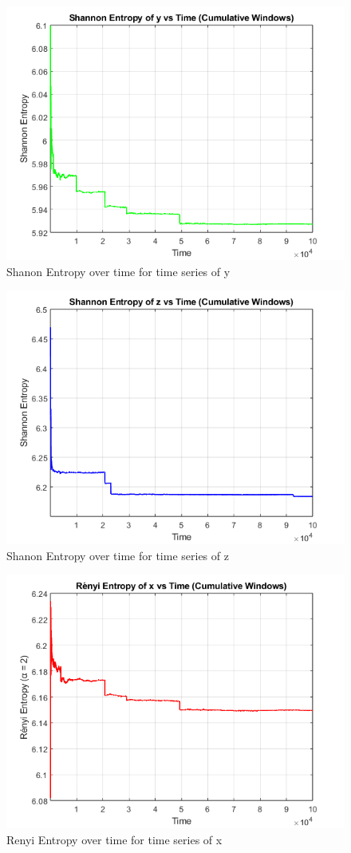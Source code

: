 \documentclass[%
reprint,
amsmath,amssymb,
aps,
floatfix,
]{revtex4-2}
\begin{document}
		\begin{figure}[htbp]
		\centering
		\includegraphics[width=0.8\linewidth]{SE_vs_time_y.png}
		\caption{Shanon Entropy over time for time series of y}
		\label{fig:vx_vz}
	\end{figure}
		\begin{figure}[htbp]
		\centering
		\includegraphics[width=0.8\linewidth]{SE_vs_time_z.png}
		\caption{Shanon Entropy over time for time series of z}
		\label{fig:vx_vz}
	\end{figure}
		\begin{figure}[htbp]
		\centering
		\includegraphics[width=0.8\linewidth]{RE_vs_time_x.png}
		\caption{Renyi Entropy over time for time series of x}
		\label{fig:Renyi Entropy}
	\end{figure}
\end{document}
